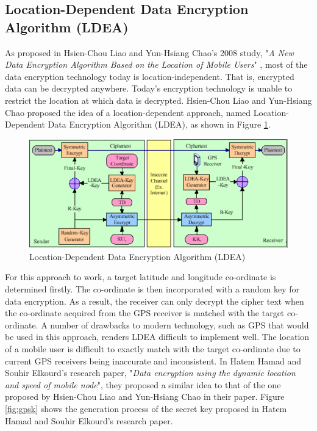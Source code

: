 \documentclass[journal]{IEEEtran}
\begin{document}
\subsection{\textbf{Location-Dependent Data Encryption Algorithm (LDEA)}}
As proposed in Hsien-Chou Liao and Yun-Hsiang Chao's 2008 study, "\textit{A New Data Encryption Algorithm Based on the Location of Mobile Users}" \cite{new_encryption_mobile}, most of the data encryption technology today is location-independent. That is, encrypted data can be decrypted anywhere. Today's encryption technology is unable to restrict the location at which data is decrypted. Hsien-Chou Liao and Yun-Hsiang Chao proposed the idea of a location-dependent approach, named Location-Dependent Data Encryption Algorithm (LDEA), as shown in Figure \ref{fig:ldea}. 

\newline
\begin{figure}[!h]
    \centering
    \includegraphics[scale=.6]{ldea}
    \caption{Location-Dependent Data Encryption Algorithm (LDEA)}
    \label{fig:ldea}
\end{figure}

For this approach to work, a target latitude and longitude co-ordinate is determined firstly. The co-ordinate is then incorporated with a random key for data encryption. As a result, the receiver can only decrypt the cipher text when the co-ordinate acquired from the GPS receiver is matched with the target co-ordinate. A number of drawbacks to modern technology, such as GPS that would be used in this approach, renders LDEA difficult to implement well. The location of a mobile user is difficult to exactly match with the target co-ordinate due to current GPS receivers being inaccurate and inconsistent.
\newline\newline
In Hatem Hamad and Souhir Elkourd's research paper, "\textit{Data encryption using the dynamic location and speed of mobile node}", they proposed a similar idea to that of the one proposed by Hsien-Chou Liao and Yun-Hsiang Chao in their paper. Figure \ref{fig:gpsk} shows the generation process of the secret key proposed in Hatem Hamad and Souhir Elkourd's research paper. 
\end{document}

